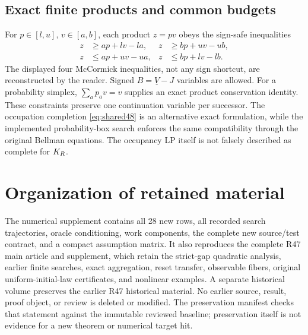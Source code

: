 \subsection{Exact finite products and common budgets}
For $p\in[l,u]$, $v\in[a,b]$, each product $z=pv$ obeys the sign-safe inequalities
\begin{align*}
 z&\ge ap+lv-la,& z&\ge bp+uv-ub,\\
 z&\le ap+uv-ua,& z&\le bp+lv-lb.
\end{align*}
The displayed four McCormick inequalities, not any sign shortcut, are reconstructed by the reader. Signed $B=\underline V-J$ variables are allowed. For a probability simplex, $\sum_a p_a v=v$ supplies an exact product conservation identity. These constraints preserve one continuation variable per successor. The occupation completion \eqref{eq:shared48} is an alternative exact formulation, while the implemented probability-box search enforces the same compatibility through the original Bellman equations. The occupancy LP itself is not falsely described as complete for $K_R$.

\section{Organization of retained material}\label{app:preserve48}
The numerical supplement contains all 28 new rows, all recorded search trajectories, oracle conditioning, work components, the complete new source/test contract, and a compact assumption matrix. It also reproduces the complete R47 main article and supplement, which retain the strict-gap quadratic analysis, earlier finite searches, exact aggregation, reset transfer, observable fibers, original uniform-initial-law certificates, and nonlinear examples. A separate historical volume preserves the earlier R47 historical material. No earlier source, result, proof object, or review is deleted or modified. The preservation manifest checks that statement against the immutable reviewed baseline; preservation itself is not evidence for a new theorem or numerical target hit.
